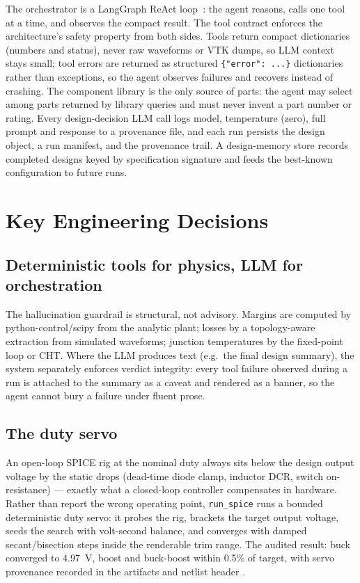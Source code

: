 \documentclass[conference]{IEEEtran}
\newcommand{\eg}{e.g.}
\begin{document}
The orchestrator is a LangGraph ReAct loop~\cite{langgraph}: the agent
reasons, calls one tool at a time, and observes the compact result. The
tool contract enforces the architecture's safety property from both
sides. Tools return compact dictionaries (numbers and status), never raw
waveforms or VTK dumps, so LLM context stays small; tool errors are
returned as structured \texttt{\{"error": ...\}} dictionaries rather
than exceptions, so the agent observes failures and recovers instead of
crashing. The component library is the only source of parts: the agent
may select among parts returned by library queries and must never
invent a part number or rating. Every design-decision LLM call logs
model, temperature (zero), full prompt and response to a provenance
file, and each run persists the design object, a run manifest, and the
provenance trail. A design-memory store records completed designs keyed
by specification signature and feeds the best-known configuration to
future runs.

\section{Key Engineering Decisions}
\label{sec:decisions}

\subsection{Deterministic tools for physics, LLM for orchestration}
The hallucination guardrail is structural, not advisory. Margins are
computed by python-control/scipy from the analytic plant; losses by a
topology-aware extraction from simulated waveforms; junction
temperatures by the fixed-point loop or CHT. Where the LLM produces
text (\eg\ the final design summary), the system separately enforces
verdict integrity: every tool failure observed during a run is attached
to the summary as a caveat and rendered as a banner, so the agent
cannot bury a failure under fluent prose.

\subsection{The duty servo}
An open-loop SPICE rig at the nominal duty always sits below the design
output voltage by the static drops (dead-time diode clamp, inductor DCR,
switch on-resistance) --- exactly what a closed-loop controller
compensates in hardware. Rather than report the wrong operating point,
\texttt{run\_spice} runs a bounded deterministic duty servo: it probes
the rig, brackets the target output voltage, seeds the search with
volt-second balance, and converges with damped secant/bisection steps
inside the renderable trim range. The audited result: buck converged to
4.97~V, boost and buck-boost within 0.5\% of target, with servo
provenance recorded in the artifacts and netlist header
\cite{audit}.
\end{document}
